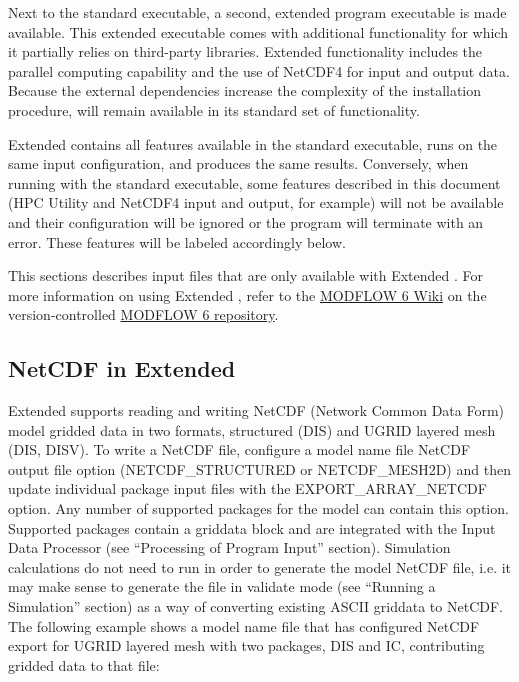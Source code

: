 Next to the standard \mf executable, a second, extended program executable is made available. This extended executable comes with additional functionality for which it partially relies on third-party libraries. Extended functionality includes the parallel computing capability and the use of NetCDF4 for input and output data. Because the external dependencies increase the complexity of the installation procedure, \mf will remain available in its standard set of functionality.

Extended \mf contains all features available in the standard executable, runs on the same input configuration, and produces the same results. Conversely, when running with the standard executable, some features described in this document (HPC Utility and NetCDF4 input and output, for example) will not be available and their configuration will be ignored or the program will terminate with an error. These features will be labeled accordingly below.

This sections describes input files that are only available with Extended \mf.  For more information on using Extended \mf, refer to the \href{https://github.com/MODFLOW-ORG/modflow6/wiki}{MODFLOW 6 Wiki} on the version-controlled \href{https://github.com/MODFLOW-ORG/modflow6}{MODFLOW 6 repository}.

\newpage
\subsection{NetCDF in Extended \mf}
Extended \mf supports reading and writing NetCDF (Network Common Data Form) model gridded data in two formats, structured (DIS) and UGRID layered mesh (DIS, DISV). To write a NetCDF file, configure a model name file NetCDF output file option (NETCDF\_STRUCTURED or NETCDF\_MESH2D) and then update individual package input files with the EXPORT\_ARRAY\_NETCDF option. Any number of supported packages for the model can contain this option. Supported packages contain a griddata block and are integrated with the Input Data Processor (see ``Processing of Program Input'' section). Simulation calculations do not need to run in order to generate the model NetCDF file, i.e. it may make sense to generate the file in \mf validate mode (see ``Running a Simulation'' section) as a way of converting existing ASCII griddata to NetCDF. The following example shows a model name file that has configured NetCDF export for UGRID layered mesh with two packages, DIS and IC, contributing gridded data to that file:


